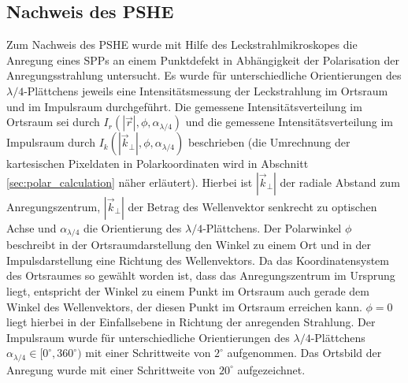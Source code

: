 \documentclass[titlepage,  ngerman]{article}
\begin{document}
	\subsection{Nachweis des PSHE}
	Zum Nachweis des PSHE wurde mit Hilfe des Leckstrahlmikroskopes die Anregung eines SPPs an einem Punktdefekt in Abhängigkeit der Polarisation der Anregungsstrahlung untersucht. Es wurde für unterschiedliche Orientierungen des $\lambda /4$-Plättchens jeweils eine Intensitätsmessung der Leckstrahlung im Ortsraum und im Impulsraum durchgeführt. Die gemessene Intensitätsverteilung im Ortsraum sei durch $I_r(|\vec{r}|, \phi, \alpha_{\lambda /4})$ und die gemessene Intensitätsverteilung im Impulsraum durch $I_k(|\vec{k}_\perp|, \phi, \alpha_{\lambda /4})$ beschrieben (die Umrechnung der kartesischen Pixeldaten in Polarkoordinaten wird in Abschnitt \ref{sec:polar_calculation} näher erläutert). Hierbei ist $|\vec{k}_\perp|$ der radiale Abstand zum Anregungszentrum, $|\vec{k}_\perp|$ der Betrag des Wellenvektor senkrecht zu optischen Achse und $\alpha_{\lambda/4}$ die Orientierung des $\lambda/4$-Plättchens. Der Polarwinkel $\phi$ beschreibt in der Ortsraumdarstellung den Winkel zu einem Ort und in der Impulsdarstellung eine Richtung des Wellenvektors. Da das Koordinatensystem des Ortsraumes so gewählt worden ist, dass das Anregungszentrum im Ursprung liegt, entspricht der Winkel zu einem Punkt im Ortsraum auch gerade dem Winkel des Wellenvektors, der diesen Punkt im Ortsraum erreichen kann. $\phi = 0$ liegt hierbei in der Einfallsebene in Richtung der anregenden Strahlung. Der Impulsraum wurde für unterschiedliche Orientierungen des $\lambda/4$-Plättchens  $\alpha_{\lambda/4} \in [0^\circ,360^\circ)$ mit einer Schrittweite von $2^\circ$ aufgenommen. Das Ortsbild der Anregung wurde mit einer Schrittweite von $20^\circ$ aufgezeichnet.
	
\end{document}
